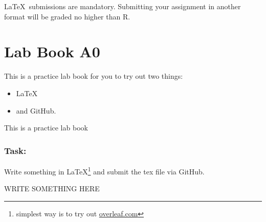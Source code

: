 \documentclass{labbook}
\begin{document}
\begin{mdframed}[backgroundcolor=blue!20]
\LaTeX ~submissions are mandatory. Submitting your assignment in another format will be graded no higher than R.
\end{mdframed}

\section{Lab Book A0}
This is a practice lab book for you to try out two things:
\begin{itemize}
    \item \LaTeX
    \item and GitHub.
\end{itemize} 


\begin{problem}{1}{0}{This is a practice lab book}

\subsubsection*{Task:}
Write something in LaTeX\footnote{simplest way is to try out \url{overleaf.com}} and submit the tex file via GitHub.
\end{problem}

\begin{solution}

WRITE SOMETHING HERE

\end{solution}
\end{document}
